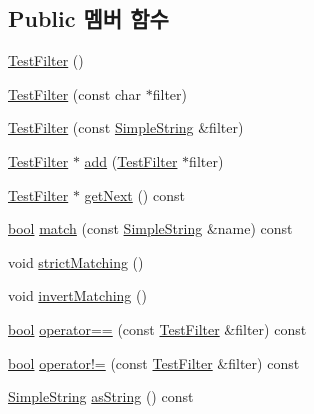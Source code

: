 \subsection*{Public 멤버 함수}
\begin{DoxyCompactItemize}
\item 
\hyperlink{class_test_filter_a7f317c5d6a28c105f3978589d76fb609}{Test\+Filter} ()
\item 
\hyperlink{class_test_filter_a3510b71f9f8b83f3eaa6e98dff22c8b2}{Test\+Filter} (const char $\ast$filter)
\item 
\hyperlink{class_test_filter_a9ecb402a6dc07bd6d11009ecde3a4819}{Test\+Filter} (const \hyperlink{class_simple_string}{Simple\+String} \&filter)
\item 
\hyperlink{class_test_filter}{Test\+Filter} $\ast$ \hyperlink{class_test_filter_ae532a4739c31605009dfd14f374c8a69}{add} (\hyperlink{class_test_filter}{Test\+Filter} $\ast$filter)
\item 
\hyperlink{class_test_filter}{Test\+Filter} $\ast$ \hyperlink{class_test_filter_ac7f0e458986dcfd442c3c8ee761344b0}{get\+Next} () const 
\item 
\hyperlink{avb__gptp_8h_af6a258d8f3ee5206d682d799316314b1}{bool} \hyperlink{class_test_filter_a7d8e54842e7457a8069cfa57bdfbe1bc}{match} (const \hyperlink{class_simple_string}{Simple\+String} \&name) const 
\item 
void \hyperlink{class_test_filter_a67e3ce804b0e3a08b8c7a4655e77e4ff}{strict\+Matching} ()
\item 
void \hyperlink{class_test_filter_a1a66fe42927a04f354a09ebcacb54309}{invert\+Matching} ()
\item 
\hyperlink{avb__gptp_8h_af6a258d8f3ee5206d682d799316314b1}{bool} \hyperlink{class_test_filter_adfbf315b7e8665fa011c821afd62d588}{operator==} (const \hyperlink{class_test_filter}{Test\+Filter} \&filter) const 
\item 
\hyperlink{avb__gptp_8h_af6a258d8f3ee5206d682d799316314b1}{bool} \hyperlink{class_test_filter_a2cf5849bc306f4856bee45bb94d7a953}{operator!=} (const \hyperlink{class_test_filter}{Test\+Filter} \&filter) const 
\item 
\hyperlink{class_simple_string}{Simple\+String} \hyperlink{class_test_filter_a40fbb3ce4e7cb227afb9949f0d1dc640}{as\+String} () const 
\end{DoxyCompactItemize}
